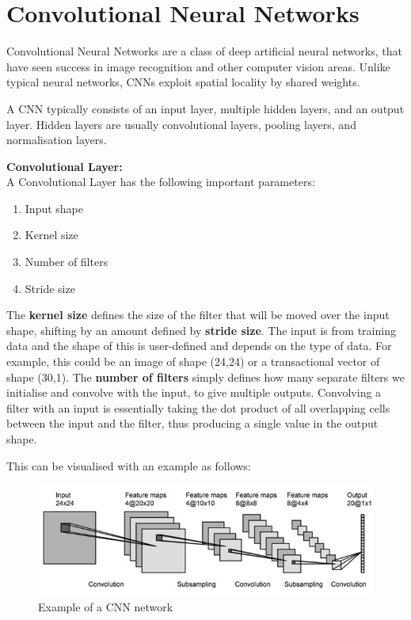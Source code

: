 \documentclass[12pt,a4paper,twoside]{report}
\begin{document}
\section{Convolutional Neural Networks}
Convolutional Neural Networks\cite{DBLP:journals/corr/SimonyanZ14a} are a class of deep artificial neural networks, that have seen success in image recognition and other computer vision areas. Unlike typical neural networks, CNNs exploit spatial locality by shared weights. 

A CNN typically consists of an input layer, multiple hidden layers, and an output layer. Hidden layers are usually convolutional layers, pooling layers, and normalisation layers. 

\textbf{Convolutional Layer:}\\
A Convolutional Layer has the following important parameters: 
\begin{enumerate}
  \item Input shape
  \item Kernel size
  \item Number of filters
  \item Stride size
\end{enumerate}

The \textbf{kernel size} defines the size of the filter that will be moved over the input shape, shifting by an amount defined by \textbf{stride size}. The input is from training data and the shape of this is user-defined and depends on the type of data. For example, this could be an image of shape (24,24) or a transactional vector of shape (30,1). The \textbf{number of filters} simply defines how many separate filters we initialise and convolve with the input, to give multiple outputs. Convolving a filter with an input is essentially taking the dot product of all overlapping cells between the input and the filter, thus producing a single value in the output shape. 

This can be visualised with an example as follows:\\

\begin{figure}[H]

\centering
\includegraphics[width=\textwidth]{CNN-Example}
\caption{Example of a CNN network}
\end{figure}
\end{document}
